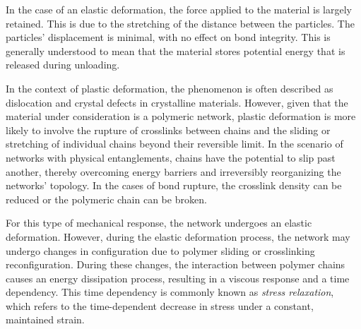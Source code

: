 
In the case of an elastic deformation, the force applied to the material is largely retained.
This is due to the stretching of the distance between the particles.
The particles' displacement is minimal, with no effect on bond integrity.
This is generally understood to mean that the material stores potential energy that is released during unloading.

In the context of plastic deformation, the phenomenon is often described as dislocation and crystal defects in crystalline materials.
However, given that the material under consideration is a polymeric network, plastic deformation is more likely to involve the rupture of crosslinks between chains and the sliding or stretching of individual chains beyond their reversible limit.
In the scenario of networks with physical entanglements, chains have the potential to slip past another, thereby overcoming energy barriers and irreversibly reorganizing the networks' topology.
In the cases of bond rupture, the crosslink density can be reduced or the polymeric chain can be broken.

For this type of mechanical response, the network undergoes an elastic deformation.
However, during the elastic deformation process, the network may undergo changes in configuration due to polymer sliding or crosslinking reconfiguration.
During these changes, the interaction between polymer chains causes an energy dissipation process, resulting in a viscous response and a time dependency.
This time dependency is commonly known as \textit{stress relaxation}, which refers to the time-dependent decrease in stress under a constant, maintained strain.


